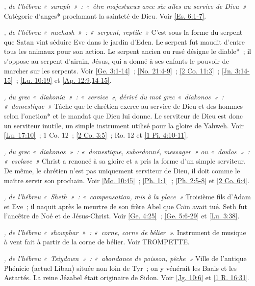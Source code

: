 \begin{multicols}{2}
\textit{, de l'hébreu «~saraph~»~: «~être majestueux avec six ailes au service de Dieu~»}\newline
Catégorie d'anges* proclamant la sainteté de Dieu. Voir \vref{Es. 6:1-7}.

\textit{, de l'hébreu «~nachash~»~: «~serpent, reptile~»}\newline
C'est sous la forme du serpent que Satan vint séduire Eve dans le jardin d'Eden. Le serpent fut maudit d'entre tous les animaux pour son action. Le serpent ancien ou rusé désigne le diable*~; il s'oppose au serpent d'airain, Jésus, qui a donné à ses enfants le pouvoir de marcher sur les serpents. Voir \vref{Ge. 3:1-14}~; \vref{No. 21:4-9}~; \vref{2 Co. 11:3}~; \vref{Jn. 3:14-15}~; \vref{Lu. 10:19} et \vref{Ap. 12:9,14-15}.

\textit{, du grec «~diakonia~»~: «~service~», dérivé du mot grec «~diakonos~»~: «~domestique~»}\newline
Tâche que le chrétien exerce au service de Dieu et des hommes selon l'onction* et le mandat que Dieu lui donne. Le serviteur de Dieu est donc un serviteur inutile, un simple instrument utilisé pour la gloire de Yahweh. Voir \vref{Lu. 17:10}~; 1 Co. 12~; \vref{2 Co. 3:5}~; Ro. 12 et \vref{1 Pi. 4:10-11}.

\textit{, du grec «~diakonos~»~: «~domestique, subordonné, messager~» ou «~doulos~»~: «~esclave~»}\newline
Christ a renoncé à sa gloire et a pris la forme d'un simple serviteur. De même, le chrétien n'est pas uniquement serviteur de Dieu, il doit comme le maître servir son prochain. Voir \vref{Mc. 10:45}~; \vref{Ph. 1:1}~; \vref{Ph. 2:5-8} et \vref{2 Co. 6:4}.

\textit{, de l'hébreu «~Sheth~»~: «~compensation, mis à la place~»}\newline
Troisième fils d'Adam et Eve~; il naquit après le meurtre de son frère Abel que Caïn avait tué. Seth fut l'ancêtre de Noé et de Jésus-Christ. Voir \vref{Ge. 4:25}~; \vref{Ge. 5:6-29} et \vref{Lu. 3:38}.

\textit{, de l'hébreu «~showphar~»~: «~corne, corne de bélier~».}\newline
Instrument de musique à vent fait à partir de la corne de bélier. Voir TROMPETTE.

\textit{, de l'hébreu «~Tsiydown~»~: «~abondance de poisson, pêche~»}\newline
Ville de l'antique Phénicie (actuel Liban) située non loin de Tyr~; on y vénérait les Baals et les Astartés. La reine Jézabel était originaire de Sidon. Voir \vref{Jg. 10:6} et \vref{1 R. 16:31}.


\end{multicols}
